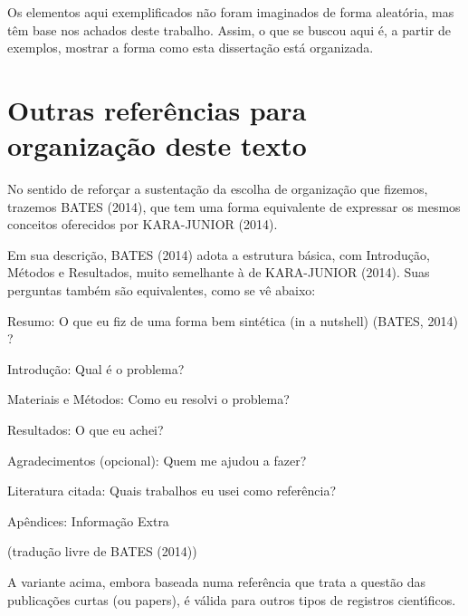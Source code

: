 \documentclass[
12pt,		%
openright,	%
twoside,  %
a4paper,			%
chapter=TITLE,		%
english,			%
french,				%
spanish,			%
brazil				%
]{USPSC-classe/USPSC}
\begin{document}
Os elementos aqui exemplificados n\~ao foram imaginados de forma aleat\'oria, mas t\^em base nos achados deste trabalho. Assim, o que se buscou aqui \'e, a partir de exemplos, mostrar a forma como esta disserta\c{c}\~ao est\'a organizada.


\section[Outras refer\^encias para organiza\c{c}\~ao deste texto]{Outras refer\^encias para organiza\c{c}\~ao deste texto}\label{Outras refer\^encias para organiza\c{c}\~ao deste texto}
No sentido de refor\c{c}ar a sustenta\c{c}\~ao da escolha de organiza\c{c}\~ao que fizemos, trazemos  BATES (2014), que tem uma forma equivalente de expressar os mesmos conceitos oferecidos por  KARA-JUNIOR (2014).


Em sua descri\c{c}\~ao, BATES (2014)  adota a estrutura b\'asica, com \textquotedbl Introdu\c{c}\~ao, M\'etodos e Resultados\textquotedbl , muito semelhante \`a de KARA-JUNIOR (2014). Suas perguntas tamb\'em s\~ao equivalentes, como se v\^e abaixo:



\begin{alineas}
\item Resumo: O que eu fiz de uma forma bem sint\'etica (\textquotedbl in a nutshell\textquotedbl ) (BATES, 2014) ?
\item Introdu\c{c}\~ao: Qual \'e o problema?
\item Materiais e M\'etodos: Como eu resolvi o problema?
\item Resultados: O que eu achei?
\item Agradecimentos (opcional): Quem me ajudou a fazer?
\item Literatura citada: Quais trabalhos eu usei como refer\^encia?
\item Ap\^endices: Informa\c{c}\~ao Extra
\end{alineas}

\begin{flushright}
\setlength{\absparsep}{0pt}
\tiny \begin{flushright}
\setlength{\absparsep}{0pt}
\tiny (tradu\c{c}\~ao livre de BATES (2014)) \normalsize 
\end{flushright}

 \normalsize 
\end{flushright}


A variante acima, embora baseada numa refer\^encia que trata a quest\~ao das publica\c{c}\~oes curtas (ou \textquotedbl papers\textquotedbl ), \'e v\'alida para outros tipos de registros cient\'{\i}ficos.
\end{document}
